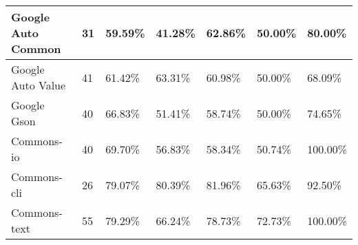 \documentclass[../../main]{subfiles}
\begin{document}
\begin{table}[!htb]
\begin{tabular}{|l|l|l|l|l|l|l|}
Google Auto   Common  & 31                                                              & 59.59\%                                                              & 41.28\%                                                                    & 62.86\%                                                               & 50.00\%                                                            & 80.00\%                                                            \\ \hline
Google Auto   Value   & 41                                                              & 61.42\%                                                              & 63.31\%                                                                    & 60.98\%                                                               & 50.00\%                                                            & 68.09\%                                                            \\ \hline
Google Gson           & 40                                                              & 66.83\%                                                              & 51.41\%                                                                    & 58.74\%                                                               & 50.00\%                                                            & 74.65\%                                                            \\ \hline
Commons-io            & 40                                                              & 69.70\%                                                              & 56.83\%                                                                    & 58.34\%                                                               & 50.74\%                                                            & 100.00\%                                                           \\ \hline
Commons-cli           & 26                                                              & 79.07\%                                                              & 80.39\%                                                                    & 81.96\%                                                               & 65.63\%                                                            & 92.50\%                                                            \\ \hline
Commons-text          & 55                                                              & 79.29\%                                                              & 66.24\%                                                                    & 78.73\%                                                               & 72.73\%                                                            & 100.00\%                                                           \\ \hline

\end{tabular}
\end{table}
\end{document}
